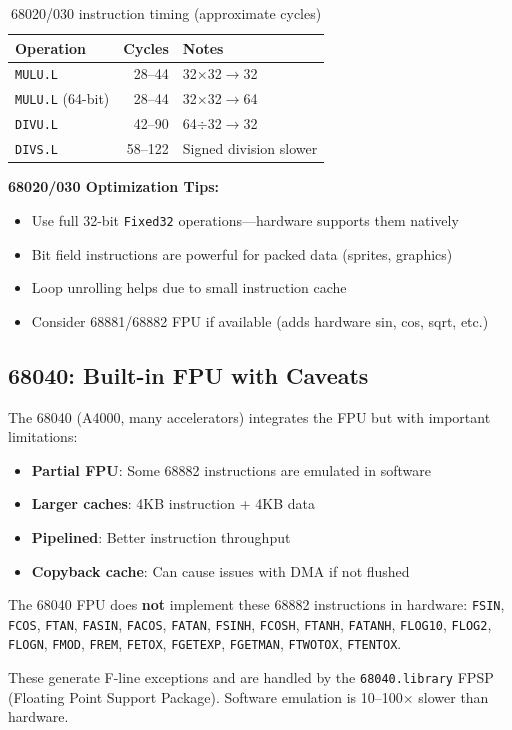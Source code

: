 \begin{table}[h]
\centering
\begin{tabular}{lrl}
\textbf{Operation} & \textbf{Cycles} & \textbf{Notes} \\
\hline
\texttt{MULU.L} & 28--44 & 32$\times$32$\rightarrow$32 \\
\texttt{MULU.L} (64-bit) & 28--44 & 32$\times$32$\rightarrow$64 \\
\texttt{DIVU.L} & 42--90 & 64$\div$32$\rightarrow$32 \\
\texttt{DIVS.L} & 58--122 & Signed division slower \\
\end{tabular}
\caption{68020/030 instruction timing (approximate cycles)}
\end{table}

\textbf{68020/030 Optimization Tips:}
\begin{itemize}
\item Use full 32-bit \texttt{Fixed32} operations---hardware supports them natively
\item Bit field instructions are powerful for packed data (sprites, graphics)
\item Loop unrolling helps due to small instruction cache
\item Consider 68881/68882 FPU if available (adds hardware sin, cos, sqrt, etc.)
\end{itemize}

\subsection{68040: Built-in FPU with Caveats}

The 68040 (A4000, many accelerators) integrates the FPU but with important limitations:

\begin{itemize}
\item \textbf{Partial FPU}: Some 68882 instructions are emulated in software
\item \textbf{Larger caches}: 4KB instruction + 4KB data
\item \textbf{Pipelined}: Better instruction throughput
\item \textbf{Copyback cache}: Can cause issues with DMA if not flushed
\end{itemize}

\begin{warningbox}
The 68040 FPU does \textbf{not} implement these 68882 instructions in hardware:
\texttt{FSIN}, \texttt{FCOS}, \texttt{FTAN}, \texttt{FASIN}, \texttt{FACOS}, \texttt{FATAN}, \texttt{FSINH}, \texttt{FCOSH}, \texttt{FTANH}, \texttt{FATANH}, \texttt{FLOG10}, \texttt{FLOG2}, \texttt{FLOGN}, \texttt{FMOD}, \texttt{FREM}, \texttt{FETOX}, \texttt{FGETEXP}, \texttt{FGETMAN}, \texttt{FTWOTOX}, \texttt{FTENTOX}.

These generate F-line exceptions and are handled by the \texttt{68040.library} FPSP (Floating Point Support Package). Software emulation is 10--100$\times$ slower than hardware.
\end{warningbox}

